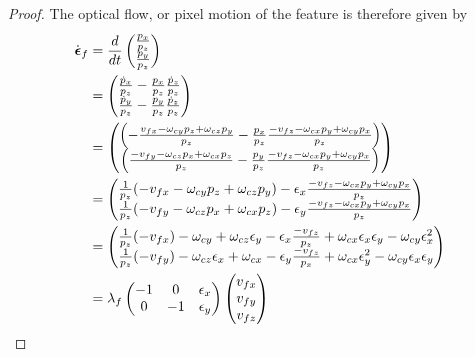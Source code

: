 \begin{proof}
	The optical flow, or pixel motion of the feature is therefore given by
	\begin{align*}
	\dot{\epsilonbf}_f &= \frac{d}{dt}\begin{pmatrix} 
	\frac{p_x}{p_z} \\ 
	\frac{p_y}{p_z}
	\end{pmatrix} \\
	&= \begin{pmatrix}  
	\frac{\dot{p}_x}{p_z} - \frac{p_x}{p_z}\frac{\dot{p}_z}{p_z} \\ 
	\frac{\dot{p}_y}{p_z} - \frac{p_y}{p_z}\frac{\dot{p}_z}{p_z} 
	\end{pmatrix} \\
	&= \begin{pmatrix}
	\left(-\frac{v_{fx} - \omega_{cy} p_z + \omega_{cz} p_y}{p_z} - \frac{p_x}{p_z}\frac{-v_{fz} - \omega_{cx} p_y + \omega_{cy} p_x}{p_z}\right) \\ 
	\left(\frac{-v_{fy} - \omega_{cz} p_x + \omega_{cx} p_z}{p_z} - \frac{p_y}{p_z}\frac{-v_{fz} - \omega_{cx} p_y + \omega_{cy} p_x}{p_z}\right)  		
	\end{pmatrix} \\
	&= \begin{pmatrix}
	\frac{1}{p_z}(-v_{fx} - \omega_{cy} p_z + \omega_{cz} p_y) - \epsilon_x\frac{-v_{fz} - \omega_{cx} p_y + \omega_{cy} p_x}{p_z} \\ 
	\frac{1}{p_z}(-v_{fy} - \omega_{cz} p_x + \omega_{cx} p_z) - \epsilon_y\frac{-v_{fz} - \omega_{cx} p_y + \omega_{cy} p_x}{p_z}
	\end{pmatrix} \\
	&= \begin{pmatrix}
	\frac{1}{p_z}(-v_{fx}) - \omega_{cy} + \omega_{cz} \epsilon_y  - \epsilon_x\frac{-v_{fz}}{p_z} + \omega_{cx} \epsilon_x\epsilon_y - \omega_{cy} \epsilon_x^2 \\ 
	\frac{1}{p_z}(-v_{fy}) - \omega_{cz} \epsilon_x + \omega_{cx} - \epsilon_y\frac{-v_{fz}}{p_x} + \omega_{cx} \epsilon_y^2 - \omega_{cy} \epsilon_x\epsilon_y
	\end{pmatrix} \\
	&= \lambda_f \begin{pmatrix} 
	-1 & 0 & \epsilon_x \\
	0 & -1 & \epsilon_y 
	\end{pmatrix} \begin{pmatrix} v_{fx} \\ v_{fy} \\ v_{fz} \end{pmatrix}

\end{align*}
\end{proof}

